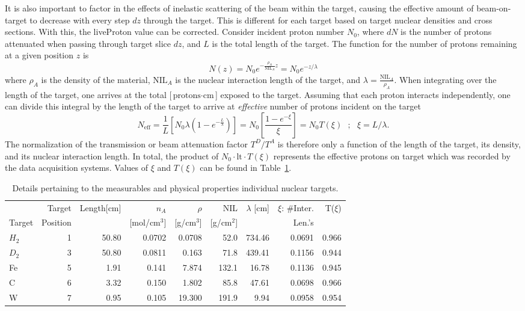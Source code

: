 It is also important to factor in the effects of inelastic scattering of the beam within the target, causing the effective amount of beam-on-target to decrease with every step $dz$ through the target. This is different for each target based on target nuclear densities and cross sections. With this, the liveProton value can be corrected. Consider incident proton number $N_0$, where $dN$ is the number of protons attenuated when passing through target slice $dz$, and $L$ is the total length of the target. The function for the number of protons remaining at a given position $z$ is
\begin{equation}
 N(z) = N_0 e^{-\frac{\rho_A}{\text{NIL}_A} z} = N_0 e^{-z/\lambda}
\end{equation}
where $\rho_A$ is the density of the material, $\text{NIL}_A$ is the nuclear interaction length of the target, and $\lambda = \frac{\text{NIL}_A}{\rho_A}$. When integrating over the length of the target, one arrives at the total [$\text{protons}\cdot \text{cm}$] exposed to the target. Assuming that each proton interacts independently, one can divide this integral by the length of the target to arrive at \emph{effective} number of protons incident on the target
\begin{equation}
N_{\text{eff}} = \frac{1}{L} \left[ N_0 \lambda (1 - e^{-\frac{L}{\lambda}})\right] = N_0 \left[\frac{1 - e^{-\xi}}{\xi}\right] =  N_0 T(\xi)\ \ \ ;\ \ \ 
\xi = L/\lambda.
\end{equation}
The normalization of the transmission or beam attenuation factor $T^D/T^A$ is therefore only a function of the length of the target, its density, and its nuclear interaction length. In total, the product of $N_0 \cdot \text{lt} \cdot T(\xi)$ represents the effective protons on target which was recorded by the data acquisition systems. Values of $\xi$ and $T(\xi)$ can be found in Table~\ref{tab:targ-details}.

\begin{table}
	\centering
	\begin{tabular}{lrrrrrrrr}
		\toprule
		{} &  Target &  Length[cm] & $n_A$  & $\rho$  &  NIL  &   $\lambda$ [cm] & $\xi$: \#Inter. & T($\xi$) \\
		Target & Position & & [mol/cm$^3$] & [g/cm$^3$] & [g/cm$^2$] & & Len.'s &  \\
		\midrule
		$H_2$ & 1 & 50.80 & 0.0702 & 0.0708 & 52.0 & 734.46 & 0.0691 & 0.966 \\ 
		$D_2$ & 3 & 50.80 & 0.0811 & 0.163 & 71.8 & 439.41 & 0.1156 & 0.944 \\
		Fe & 5 & 1.91 &	0.141 & 7.874 & 132.1 & 16.78 & 0.1136 & 0.945 \\
		C & 6 & 3.32 & 0.150 & 1.802 & 85.8 & 47.61 & 0.0698 & 0.966 \\
		W & 7 & 0.95 & 0.105 & 19.300 & 191.9 & 9.94 & 0.0958 & 0.954 \\
		\bottomrule
	\end{tabular}
	\caption{Details pertaining to the measurables and physical properties individual nuclear targets.}
	\label{tab:targ-details}
\end{table}


